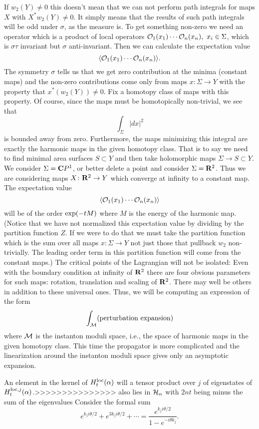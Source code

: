 If $w_2(Y)\not= 0$ this doesn't mean that we can not perform path
integrals for maps $X$ with $X^*w_2(Y)\not=0$. It simply means that
the results of such path integrals will be odd under $\sigma$, as the
measure is. To get something non-zero  we need  an
operator which is a product of  local operators
${\cal O}_1(x_1)\cdots {\cal O}_n(x_n), \ x_i\in \Sigma$, which is
$\sigma\tau$ 
invariant but $\sigma$ anti-invariant. Then we can calculate the
expectation value
$$\langle {\cal O}_1(x_1)\cdots{\cal O}_n(x_n)\rangle.$$
The symmetry $\sigma$ tells us that we get zero contribution at the
minima (constant maps) and 
the non-zero contributions come only from maps $x\colon \Sigma\to Y$ with
the property that $x^*(w_2(Y))\not= 0$.
Fix a homotopy class of maps with this property.
Of course, since the maps must be homotopically non-trivial, we see
that
$$\int_\Sigma|dx|^2$$
is bounded away from zero. Furthermore, the  maps minimizing this
integral are exactly the harmonic maps in the given homotopy class.
That is to say we need to find minimal area surfaces $S\subset Y$
and then take holomorphic maps
$\Sigma \to S\subset Y$.
We consider $\Sigma={\bf C}P^1$, or better delete a point and consider
$\Sigma ={\bf R}^2$.  Thus we are considering maps
$X\colon {\bf R}^2\to Y$ which converge at infinity to a constant map.
The expectation value
$$\langle {\cal O}_1(x_1)\cdots{\cal O}_n(x_n)\rangle$$
will be of the order ${\rm
exp}(-tM)$ where $M$ is the energy of the harmonic map.
(Notice that we have not normalized this expectation value by dividing
by the partition function $Z$.  If we were to do that we must take the
partition function which is the sum over all maps $x\colon \Sigma\to
Y$ not just those that pullback $w_2$ non-trivially.  The leading
order term in this partition function will come from the constant
maps.)
The critical points of the Lagrangian will not be isolated:
  Even with the
boundary condition at infinity of ${\bf R}^2$ there are four obvious
parameters for 
such maps: rotation, translation and scaling of ${\bf R}^2$. 
There may well be others in addition to these universal ones.
Thus, we
will be computing an expression of the form
$$\int_{\cal M}({\rm perturbation\ expansion)}$$
where ${\cal M}$ is the instanton moduli space, i.e., the space of
harmonic maps in the given homotopy class.
This time the propagator is more complicated and the linearization
around the instanton moduli space gives only an asymptotic
expansion.





An element in the kernel of $H^{\rm loc}_t(\alpha)$ will a tensor
product over $j$ of eigenstates of $H_t^{{\rm loc},j}(\alpha)$.>>>>>>>>>>>>>>>
also lies in ${\cal H}_n$ with $2nt$ being minus the sum of the eigenvalues
Consider the formal sum
$$e^{k_ji\theta/2}+e^{3k_ji\theta/2}+\cdots=\frac{e^{k_ji\theta/2}}
{1-e^{-i\theta k_j}}. $$





